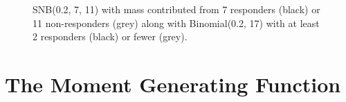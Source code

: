 \documentclass[12pt]{article}
\begin{document}
\begin{figure}[t!]
\centering
{}
\hfill
{}
\caption{
SNB(0.2, 7, 11) with mass contributed from 
7 responders (black) or 11 non-responders (grey) along with 
Binomial(0.2, 17) with at least 2 responders (black) or fewer (grey).
}
\label{fig:snb_bin_compare}
\end{figure}

\section{The Moment Generating Function}
\end{document}
